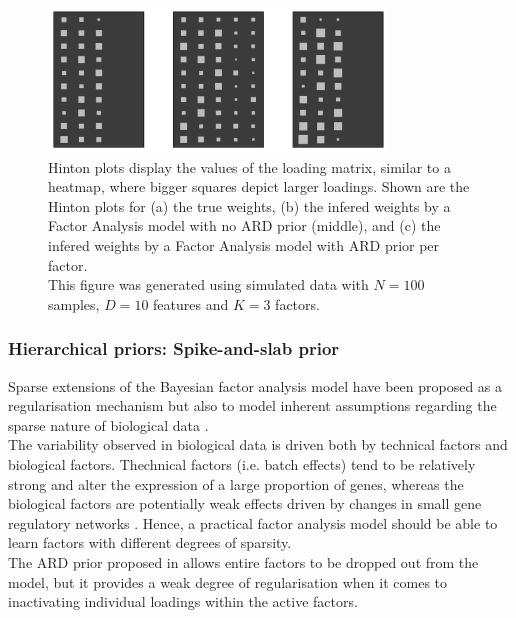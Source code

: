 \begin{figure}[H] \begin{center}
	\includegraphics[width=0.8\textwidth]{Chapter2/Figs/hinton}
            \caption[(Copied from Damien's thesis) Hinton plot of the loading matrix for a Bayesian Factor Analysis model with an ARD prior]{Hinton plots display the values of the loading matrix, similar to a heatmap, where bigger squares depict larger loadings. Shown are the Hinton plots for (a) the true weights, (b) the infered weights by a Factor Analysis model with no ARD prior (middle), and (c) the infered weights by a Factor Analysis model with ARD prior per factor.\\
            This figure was generated using simulated data with $N=100$ samples, $D=10$ features and $K=3$ factors.}
	\label{fig:hinton}
\end{center} \end{figure}

\subsubsection{Hierarchical priors: Spike-and-slab prior}
Sparse extensions of the Bayesian factor analysis model have been proposed as a regularisation mechanism but also to model inherent assumptions regarding the sparse nature of biological data \cite{Stegle2012,Gao2013}.\\
The variability observed in biological data is driven both by technical factors and biological factors. Thechnical factors (i.e. batch effects) tend to be relatively strong and alter the expression of a large proportion of genes, whereas the biological factors are potentially weak effects driven by changes in small gene regulatory networks \cite{Gao2013}. Hence, a practical factor analysis model should be able to learn factors with different degrees of sparsity.\\
The ARD prior proposed in  allows entire factors to be dropped out from the model, but it provides a weak degree of regularisation when it comes to inactivating individual loadings within the active factors.\\

